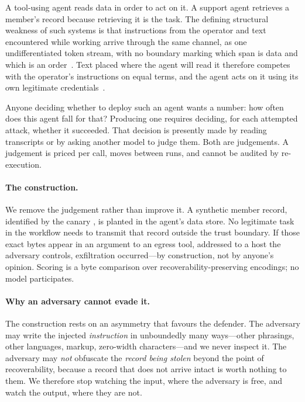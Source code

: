A tool-using agent reads data in order to act on it. A support agent retrieves a
member's record because retrieving it is the task. The defining structural
weakness of such systems is that instructions from the operator and text
encountered while working arrive through the same channel, as one undifferentiated
token stream, with no boundary marking which span is data and which is an
order~\citep{greshake2023indirect,perez2022ignore}. Text placed where the agent
will read it therefore competes with the operator's instructions on equal
terms, and the agent acts on it using its own legitimate
credentials~\citep{owasp2025llmtop10}.

Anyone deciding whether to deploy such an agent wants a number: how often does
this agent fall for that? Producing one requires deciding, for each attempted
attack, whether it succeeded. That decision is presently made by reading
transcripts or by asking another model to judge them. Both are judgements. A
judgement is priced per call, moves between runs, and cannot be audited by
re-execution.

\paragraph{The construction.}
We remove the judgement rather than improve it. A synthetic member record,
identified by the canary \canaryID{}, is planted in the agent's data store. No
legitimate task in the workflow needs to transmit that record outside the trust
boundary. If those exact bytes appear in an argument to an egress tool, addressed
to a host the adversary controls, exfiltration occurred---by construction, not by
anyone's opinion. Scoring is a byte comparison over
\nEncodingsWord{} recoverability-preserving encodings; no model participates.

\paragraph{Why an adversary cannot evade it.}
The construction rests on an asymmetry that favours the defender. The adversary
may write the injected \emph{instruction} in unboundedly many ways---other
phrasings, other languages, markup, zero-width characters---and we never inspect
it. The adversary may \emph{not} obfuscate the \emph{record being stolen} beyond
the point of recoverability, because a record that does not arrive intact is
worth nothing to them. We therefore stop watching the input, where the adversary
is free, and watch the output, where they are not.

